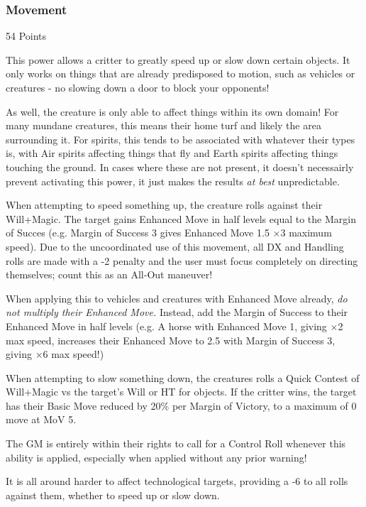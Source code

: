 \begin{multicols*}{3}
	
	\subsubsection{Movement}\label{movement}
	\begin{flushright}
		54 Points
	\end{flushright}
	
	This power allows a critter to greatly speed up or slow down certain objects. It only works on things that are already predisposed to motion, such as vehicles or creatures - no slowing down a door to block your opponents! 
	
	As well, the creature is only able to affect things within its own domain! For many mundane creatures, this means their home turf and likely the area surrounding it. For spirits, this tends to be associated with whatever their types is, with Air spirits affecting things that fly and Earth spirits affecting things touching the ground. In cases where these are not present, it doesn't necessairly prevent activating this power, it just makes the results \textit{at best} unpredictable.
	
	When attempting to speed something up, the creature rolls against their Will+Magic. The target gains Enhanced Move in half levels equal to the Margin of Succes (e.g. Margin of Success 3 gives Enhanced Move 1.5 \(\times\)3 maximum speed). Due to the uncoordinated use of this movement, all DX and Handling rolls are made with a -2 penalty and the user must focus completely on directing themselves; count this as an All-Out maneuver!
	
	When applying this to vehicles and creatures with Enhanced Move already, \textit{do not multiply their Enhanced Move.} Instead, add the Margin of Success to their Enhanced Move in half levels (e.g. A horse with Enhanced Move 1, giving \(\times\)2 max speed, increases their Enhanced Move to 2.5 with Margin of Success 3, giving \(\times\)6 max speed!)
	
	When attempting to slow something down, the creatures rolls a Quick Contest of Will+Magic vs the target's Will or HT for objects. If the critter wins, the target has their Basic Move reduced by 20\% per Margin of Victory, to a maximum of 0 move at MoV 5.
	
	The GM is entirely within their rights to call for a Control Roll whenever this ability is applied, especially when applied without any prior warning!
	
	It is all around harder to affect technological targets, providing a -6 to all rolls against them, whether to speed up or slow down.
	

\end{multicols*}
